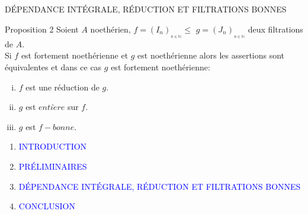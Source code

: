 \documentclass[11pt,a4paper]{beamer}
\begin{document}
	
	
	
	\begin{frame}{DÉPENDANCE INTÉGRALE, RÉDUCTION ET FILTRATIONS BONNES}
		\begin{block}{Proposition 2}
			Soient $A$ noethérien, $f=(I_{n})_{_{n\in \mathbb{N}}}\leq $ $g=(J_{n})_{_{n\in \mathbb{N}}}$ deux filtrations de $A.$ \\ Si $f$ est fortement noethérienne et $g$ est noethérienne alors les assertions sont équivalentes et dans ce cas $g$ est fortement noethérienne:
			\begin{enumerate}[(i)]
				\item $f$ est une réduction de $g.$
				\item $g$ est $enti\grave{e}re$ sur $f.$
				\item $g$ est $f-bonne.$
			\end{enumerate}
		\end{block}
	\end{frame}
	
	\begin{frame}
		\begin{enumerate}
			\item<0> \textcolor{blue}{INTRODUCTION}
			\item<0> \textcolor{blue}{PRÉLIMINAIRES}
			\item<0> \textcolor{blue}{DÉPENDANCE INTÉGRALE, RÉDUCTION ET FILTRATIONS BONNES }
			\item<1> \textcolor{blue}{CONCLUSION}
		\end{enumerate}
	\end{frame}
	
\end{document}
